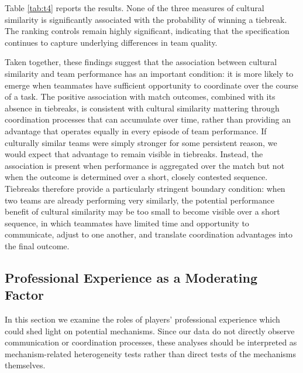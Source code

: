\documentclass[10pt]{article}
\begin{document}
Table \ref{tab:t4} reports the results. None of the three measures of cultural similarity is significantly associated with the probability of winning a tiebreak.  The ranking controls remain highly significant, indicating that the specification continues to capture underlying differences in team quality.


Taken together, these findings suggest that the association between cultural similarity and team performance has an important condition: it is more likely to emerge when teammates have sufficient opportunity to coordinate over the course of a task. The positive association with match outcomes, combined with its absence in tiebreaks, is consistent with cultural similarity mattering through coordination processes that can accumulate over time, rather than providing an advantage that operates equally in every episode of team performance. If culturally similar teams were simply stronger for some persistent reason, we would expect that advantage to remain visible in tiebreaks. Instead, the association is present when performance is aggregated over the match but not when the outcome is determined over a short, closely contested sequence. Tiebreaks therefore provide a particularly stringent boundary condition: when two teams are already performing very similarly, the potential performance benefit of cultural similarity may be too small to become visible over a short sequence, in which teammates have limited time and opportunity to communicate, adjust to one another, and translate coordination advantages into the final outcome.





\subsection{Professional Experience as a Moderating Factor}

In this section we examine the roles of players’ professional experience which could shed light on potential mechanisms. Since our data do not directly observe communication or coordination processes, these analyses should be interpreted as mechanism-related heterogeneity tests rather than direct tests of the mechanisms themselves. %
\end{document}
